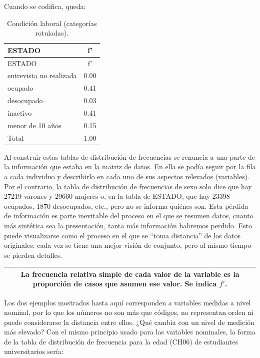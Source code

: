 \documentclass[]{book}
\begin{document}
Cuando se codifica, queda:

\begin{longtable}[]{@{}lc@{}}
\caption{\label{tab:unnamed-chunk-25}Condición laboral (categorías rotuladas).}\tabularnewline
\toprule
ESTADO & f'\tabularnewline
\midrule
\endfirsthead
\toprule
ESTADO & f'\tabularnewline
\midrule
\endhead
entrevista no realizada & 0.00\tabularnewline
ocupado & 0.41\tabularnewline
desocupado & 0.03\tabularnewline
inactivo & 0.41\tabularnewline
menor de 10 años & 0.15\tabularnewline
Total & 1.00\tabularnewline
\bottomrule
\end{longtable}

Al construir estas tablas de distribución de frecuencias se renuncia a una parte de la información que estaba en la matriz de datos. En ella se podía seguir por la fila a cada individuo y describirlo en cada uno de sus aspectos relevados (variables). Por el contrario, la tabla de distribución de frecuencias de sexo solo dice que hay 27219 varones y 29660 mujeres o, en la tabla de ESTADO, que hay 23398 ocupados, 1870 desocupados, etc., pero no se informa quiénes son. Esta pérdida de información es parte inevitable del proceso en el que se resumen datos, cuanto más sintética sea la presentación, tanta más información habremos perdido. Esto puede visualizarse como el proceso en el que se ``toma distancia'' de los datos originales: cada vez se tiene una mejor visión de conjunto, pero al mismo tiempo se pierden detalles.

\begin{longtable}[]{@{}c@{}}
\toprule
\endhead
\begin{minipage}[t]{0.97\columnwidth}\centering
La \textbf{frecuencia relativa simple} de cada valor de la variable es la proporción de casos que asumen ese valor. Se indica \(f'\).\strut
\end{minipage}\tabularnewline
\bottomrule
\end{longtable}

Los dos ejemplos mostrados hasta aquí corresponden a variables medidas a nivel nominal, por lo que los números no son más que códigos, no representan orden ni puede considerarse la distancia entre ellos. ¿Qué cambia con un nivel de medición más elevado? Con el mismo principio usado para las variables nominales, la forma de la tabla de distribución de frecuencia para la edad (CH06) de estudiantes universitarios sería:
\end{document}
